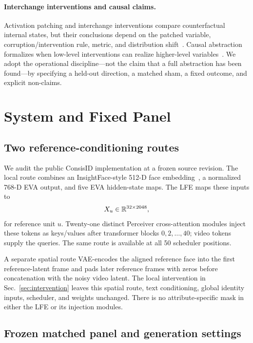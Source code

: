 \documentclass[10pt,twocolumn,letterpaper]{article}
\begin{document}
\paragraph{Interchange interventions and causal claims.}
Activation patching and interchange interventions compare counterfactual internal states, but their conclusions depend on the patched variable, corruption/intervention rule, metric, and distribution shift~\cite{heimersheim2024patching,zhang2023patching}.  Causal abstraction formalizes when low-level interventions can realize higher-level variables~\cite{geiger2023causalabstraction,geiger2024das}.  We adopt the operational discipline—not the claim that a full abstraction has been found—by specifying a held-out direction, a matched sham, a fixed outcome, and explicit non-claims.

\section{System and Fixed Panel}
\label{sec:setup}

\subsection{Two reference-conditioning routes}

We audit the public ConsisID implementation at a frozen source revision.  The local route combines an InsightFace-style 512-D face embedding~\cite{deng2019arcface}, a normalized 768-D EVA output, and five EVA hidden-state maps.  The LFE maps these inputs to
\begin{equation}
  X_u \in \mathbb{R}^{32\times 2048},
\end{equation}
for reference unit $u$.  Twenty-one distinct Perceiver cross-attention modules inject these tokens as keys/values after transformer blocks $0,2,\ldots,40$; video tokens supply the queries.  The same route is available at all 50 scheduler positions.

A separate spatial route VAE-encodes the aligned reference face into the first reference-latent frame and pads later reference frames with zeros before concatenation with the noisy video latent.  The local intervention in Sec.~\ref{sec:intervention} leaves this spatial route, text conditioning, global identity inputs, scheduler, and weights unchanged.  There is no attribute-specific mask in either the LFE or its injection modules.

\subsection{Frozen matched panel and generation settings}
\end{document}
